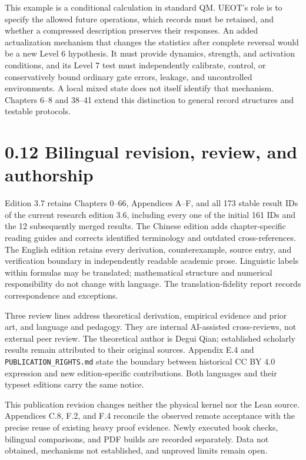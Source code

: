 \documentclass[
  11pt,
  oneside]{book}
\begin{document}
This example is a conditional calculation in standard QM. UEOT's role is
to specify the allowed future operations, which records must be
retained, and whether a compressed description preserves their
responses. An added actualization mechanism that changes the statistics
after complete reversal would be a new Level 6 hypothesis. It must
provide dynamics, strength, and activation conditions, and its Level 7
test must independently calibrate, control, or conservatively bound
ordinary gate errors, leakage, and uncontrolled environments. A local
mixed state does not itself identify that mechanism. Chapters 6--8 and
38--41 extend this distinction to general record structures and testable
protocols.

\section{0.12 Bilingual revision, review, and authorship}

Edition 3.7 retains Chapters 0--66, Appendices A--F, and all 173 stable
result IDs of the current research edition 3.6, including every one of
the initial 161 IDs and the 12 subsequently merged results. The Chinese
edition adds chapter-specific reading guides and corrects identified
terminology and outdated cross-references. The English edition retains
every derivation, counterexample, source entry, and verification
boundary in independently readable academic prose. Linguistic labels
within formulas may be translated; mathematical structure and numerical
responsibility do not change with language. The translation-fidelity
report records correspondence and exceptions.

Three review lines address theoretical derivation, empirical evidence
and prior art, and language and pedagogy. They are internal AI-assisted
cross-reviews, not external peer review. The theoretical author is Degui
Qian; established scholarly results remain attributed to their original
sources. Appendix E.4 and \texttt{PUBLICATION\_\allowbreak RIGHTS.\allowbreak md} state the
boundary between historical CC BY 4.0 expression and new
edition-specific contributions. Both languages and their typeset
editions carry the same notice.

This publication revision changes neither the physical kernel nor the
Lean source. Appendices C.8, F.2, and F.4 reconcile the observed remote
acceptance with the precise reuse of existing heavy proof evidence.
Newly executed book checks, bilingual comparisons, and PDF builds are
recorded separately. Data not obtained, mechanisms not established, and
unproved limits remain open.
\end{document}
